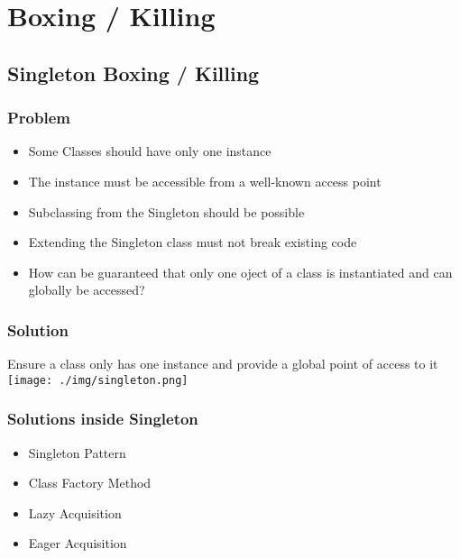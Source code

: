 
\section{Boxing / Killing}
\subsection{Singleton Boxing / Killing}
\subsubsection{Problem}
\begin{itemize}
    \item Some Classes should have only one instance
    \item The instance must be accessible from a well-known access point 
    \item Subclassing from the Singleton should be possible
    \item Extending the Singleton class must not break existing code
    \item How can be guaranteed that only one oject of a class is instantiated and can globally be accessed?
\end{itemize}
\subsubsection{Solution}
Ensure a class only has one instance and provide a global point of access to it 
\texttt{[image: ./img/singleton.png]}
\subsubsection{Solutions inside Singleton}
\begin{itemize}
    \item Singleton Pattern
    \item Class Factory Method
    \item Lazy Acquisition
    \item Eager Acquisition
\end{itemize}

